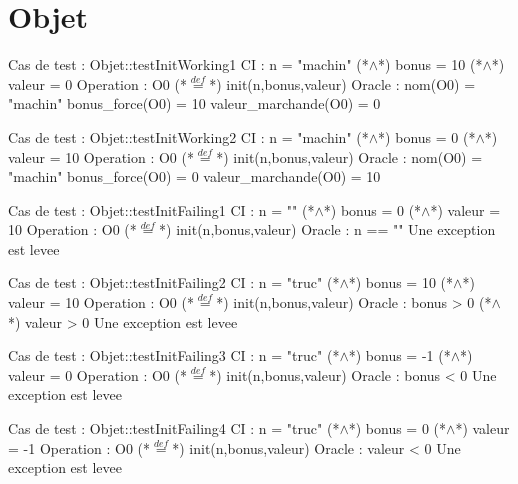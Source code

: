 \documentclass[a4paper, 11pt, notitlepage]{report}
\begin{document}
\section{Objet}
\begin{Test}

Cas de test  : Objet::testInitWorking1
CI : n = "machin" (*$\land$*) bonus = 10 (*$\land$*) valeur = 0
Operation : O0 (*$\stackrel{def}{=}$*) init(n,bonus,valeur)
Oracle :
	nom(O0) = "machin"
	bonus\_force(O0) = 10
	valeur\_marchande(O0) = 0
	
Cas de test  : Objet::testInitWorking2
CI : n = "machin" (*$\land$*) bonus = 0 (*$\land$*) valeur = 10
Operation : O0 (*$\stackrel{def}{=}$*) init(n,bonus,valeur)
Oracle :
	nom(O0) = "machin"
	bonus\_force(O0) = 0
	valeur\_marchande(O0) = 10
	
Cas de test  : Objet::testInitFailing1
CI : n = "" (*$\land$*) bonus = 0 (*$\land$*) valeur = 10
Operation : O0 (*$\stackrel{def}{=}$*) init(n,bonus,valeur)
Oracle :
	n == ""
	Une exception est levee
	
Cas de test  : Objet::testInitFailing2
CI : n = "truc" (*$\land$*) bonus = 10 (*$\land$*) valeur = 10
Operation : O0 (*$\stackrel{def}{=}$*) init(n,bonus,valeur)
Oracle :
	bonus > 0 (*$\land$*) valeur > 0
	Une exception est levee
	
Cas de test  : Objet::testInitFailing3
CI : n = "truc" (*$\land$*) bonus = -1 (*$\land$*) valeur = 0
Operation : O0 (*$\stackrel{def}{=}$*) init(n,bonus,valeur)
Oracle :
	bonus < 0
	Une exception est levee
	
Cas de test  : Objet::testInitFailing4
CI : n = "truc" (*$\land$*) bonus = 0 (*$\land$*) valeur = -1
Operation : O0 (*$\stackrel{def}{=}$*) init(n,bonus,valeur)
Oracle :
	valeur < 0
	Une exception est levee


\end{Test}
\end{document}
